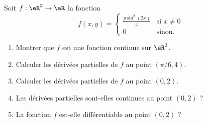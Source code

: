 \begin{exercice}\label{exoGeomAnal-0035}

Soit $f: \eR^2\to \eR $ la fonction
\begin{equation}
    f(x,y)=\begin{cases}
        \frac{ y\sin^2(2x) }{ x }    &   \text{si }x\neq 0\\
        0    &    \text{sinon.}
    \end{cases}
\end{equation}

  \begin{enumerate}
  \item Montrer que $f$ est une fonction continue sur $\eR^2$.
  \item Calculer les dérivées partielles de $f$ au point $(\pi/6, 4)$.
  \item Calculer les dérivées partielles de $f$ au point $(0,2)$.
  \item Les dérivées partielles sont-elles continues au point $(0,2)$ ?
  \item La fonction $f$ est-elle différentiable au point $(0,2)$ ? 
  \end{enumerate} 

\end{exercice}

